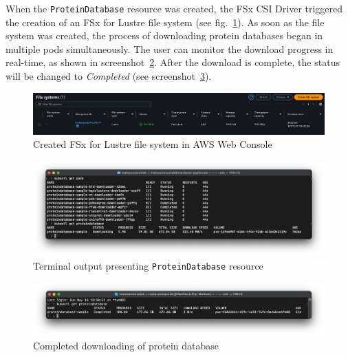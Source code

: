 When the \texttt{ProteinDatabase} resource was created, the FSx CSI Driver triggered the creation of an FSx for Lustre file system (see fig.~\ref{fig:fsx_fs}).
As soon as the file system was created, the process of downloading protein databases began in multiple pods simultaneously.
The user can monitor the download progress in real-time, as shown in screenshot~\ref{fig:used_proteindatabase_terminal}.
After the download is complete, the status will be changed to \textit{Completed} (see screenshot~\ref{fig:proteindatabase_completed_terminal}).

\begin{figure}[htbp]
    \centering
    \includegraphics[width=\textwidth]{images/fsx_fs}
    \caption{Created FSx for Lustre file system in AWS Web Console}
    \label{fig:fsx_fs}
\end{figure}

\begin{figure}[htbp]
    \centering
    \includegraphics[width=\textwidth]{images/old_proteindatabase_terminal}
    \caption{Terminal output presenting \texttt{ProteinDatabase} resource}
    \label{fig:used_proteindatabase_terminal}
\end{figure}

\begin{figure}[htbp]
    \centering
    \includegraphics[width=\textwidth]{images/proteindatabase_completed_terminal}
    \caption{Completed downloading of protein database}
    \label{fig:proteindatabase_completed_terminal}
\end{figure}

